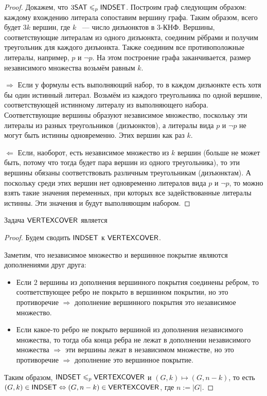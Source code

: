 \begin{proof}
Докажем, что $3\mathsf{SAT} \leqslant_p \mathsf{INDSET}$. Построим граф следующим образом: каждому вхождению литерала сопоставим вершину графа. Таким образом, всего будет $3k$ вершин, где $k$ ~--- число дизъюнктов в 3-КНФ. Вершины, соответствующие литералам из одного дизъюнкта, соединим рёбрами и получим треугольник для каждого дизъюнкта. Также соединим все противоположные литералы, например, $p$ и $\neg p$. На этом построение графа заканчивается, размер независимого множества возьмём равным $k$.

$\Rightarrow$ Если у формулы есть выполняющий набор, то в каждом дизъюнкте есть хотя бы один истинный литерал. Возьмём из каждого треугольника по одной вершине, соответствующей истинному литералу из выполняющего набора. 
Соответствующие вершины образуют независимое множество, поскольку эти литералы из разных треугольников (дизъюнктов), а литералы вида $p$ и $\neg p$ не могут быть истинны одновременно. Этих вершин как раз $k$. 

$\Leftarrow$ Если, наоборот, есть независимое множество из $k$ вершин (больше не может быть, потому что тогда будет пара вершин из одного треугольника), то эти вершины обязаны соответствовать различным треугольникам (дизъюнктам). А поскольку среди этих вершин нет одновременно литералов вида $p$ и $\neg p$, то можно взять такие значения переменных, при которых все задействованные литералы истинны. Эти значения и будут выполняющим набором.
\end{proof}

\begin{statement}
    Задача $\mathsf{VERTEXCOVER}$ является \npc
\end{statement}

\begin{proof}
    Будем сводить $\mathsf{INDSET}$ к $\mathsf{VERTEXCOVER}$. 

Заметим, что независимое множество и вершинное покрытие являются дополнениями друг друга:

\begin{itemize}
    \item Если $2$ вершины из дополнения вершинного покрытия соединены ребром, то соответствующее ребро не покрыто в вершинном покрытии, но это противоречие $\Rightarrow$ дополнение вершинного покрытия это независимое множество.
    \item Если какое-то ребро не покрыто вершиной из дополнения независимого множества, то тогда оба конца ребра не лежат в дополнении независимого множества $\Rightarrow$ эти вершины лежат в независимом множестве, но это противоречие $\Rightarrow$ дополнение это вершинное покрытие.
\end{itemize}

Таким образом, $\mathsf{INDSET} \leqslant_p \mathsf{VERTEXCOVER}$ и $(G,k) \mapsto (G,n-k)$, то есть $(G,k) \in \mathsf{INDSET} \Leftrightarrow (G,n-k) \in \mathsf{VERTEXCOVER}$, где $n:=|G|$.

\end{proof}